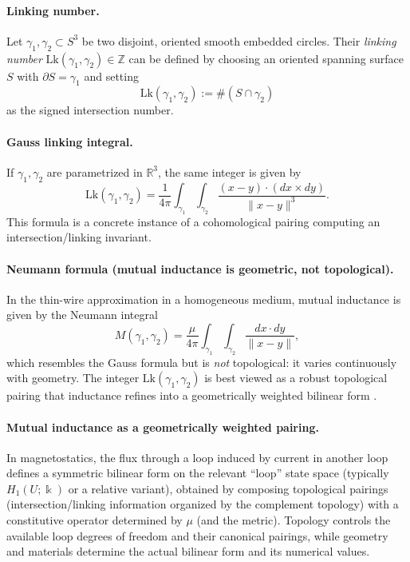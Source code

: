\documentclass[11pt]{article}
\begin{document}
\paragraph{Linking number.}
Let $\gamma_1,\gamma_2\subset S^3$ be two disjoint, oriented smooth embedded circles.
Their \emph{linking number} $\mathrm{Lk}(\gamma_1,\gamma_2)\in\mathbb{Z}$ can be defined by choosing an oriented spanning surface $S$ with $\partial S=\gamma_1$ and setting
\[
\mathrm{Lk}(\gamma_1,\gamma_2):= \#(S\cap \gamma_2)
\]
as the signed intersection number.

\paragraph{Gauss linking integral.}
If $\gamma_1,\gamma_2$ are parametrized in $\mathbb{R}^3$, the same integer is given by
\[
\mathrm{Lk}(\gamma_1,\gamma_2)
=\frac{1}{4\pi}\int_{\gamma_1}\int_{\gamma_2}
\frac{(x-y)\cdot (dx\times dy)}{\|x-y\|^3}.
\]
This formula is a concrete instance of a cohomological pairing computing an intersection/linking invariant.

\paragraph{Neumann formula (mutual inductance is geometric, not topological).}
In the thin-wire approximation in a homogeneous medium, mutual inductance is given by the Neumann integral
\[
M(\gamma_1,\gamma_2)
=\frac{\mu}{4\pi}\int_{\gamma_1}\int_{\gamma_2}\frac{dx\cdot dy}{\|x-y\|},
\]
which resembles the Gauss formula but is \emph{not} topological: it varies continuously with geometry.
The integer $\mathrm{Lk}(\gamma_1,\gamma_2)$ is best viewed as a robust topological pairing that inductance refines into a geometrically weighted bilinear form \cite{jackson_em_1998}.

\paragraph{Mutual inductance as a geometrically weighted pairing.}
In magnetostatics, the flux through a loop induced by current in another loop defines a symmetric bilinear form on the relevant ``loop'' state space (typically $H_1(U;\Bbbk)$ or a relative variant), obtained by composing topological pairings (intersection/linking information organized by the complement topology) with a constitutive operator determined by $\mu$ (and the metric).
Topology controls the available loop degrees of freedom and their canonical pairings, while geometry and materials determine the actual bilinear form and its numerical values.
\end{document}

